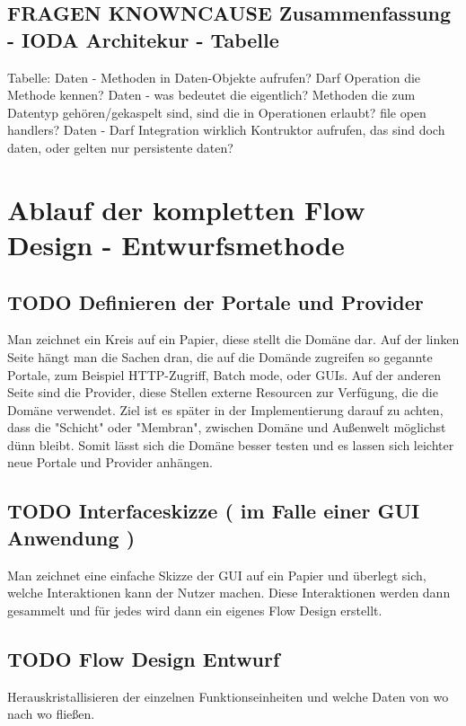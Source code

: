 \documentclass[11pt]{article}
\begin{document}
\subsection{{\bfseries\sffamily FRAGEN} KNOWNCAUSE Zusammenfassung - IODA Architekur -  Tabelle}
\label{sec:orgheadline44}

Tabelle:
Daten - Methoden in Daten-Objekte aufrufen? Darf Operation die Methode kennen?
Daten - was bedeutet die eigentlich? Methoden die zum Datentyp
gehören/gekaspelt sind, sind die in Operationen erlaubt? file open handlers?
Daten - Darf Integration wirklich Kontruktor aufrufen, das sind doch daten, oder gelten nur persistente daten?



\section{Ablauf der kompletten Flow Design - Entwurfsmethode}
\label{sec:orgheadline51}

\subsection{{\bfseries\sffamily TODO} Definieren der Portale und Provider}
\label{sec:orgheadline46}
    Man zeichnet ein Kreis auf ein Papier, diese stellt die Domäne dar.
    Auf der linken Seite hängt man die Sachen dran, die auf die Domände zugreifen so gegannte Portale, zum Beispiel HTTP-Zugriff,
    Batch mode, oder GUIs.
    Auf der anderen Seite sind die Provider, diese Stellen externe Resourcen zur Verfügung, die die Domäne verwendet.
    Ziel ist es später in der Implementierung darauf zu achten, dass die "Schicht" oder "Membran", zwischen Domäne und Außenwelt möglichst
dünn bleibt. Somit lässt sich die Domäne besser testen und es lassen sich leichter neue Portale und Provider anhängen.

\subsection{{\bfseries\sffamily TODO} Interfaceskizze ( im Falle einer GUI Anwendung )}
\label{sec:orgheadline47}
Man zeichnet eine einfache Skizze der GUI auf ein Papier und überlegt sich, welche Interaktionen kann der Nutzer machen.
Diese Interaktionen werden dann gesammelt und für jedes wird dann ein eigenes Flow Design erstellt.

\subsection{{\bfseries\sffamily TODO} Flow Design Entwurf}
\label{sec:orgheadline48}
Herauskristallisieren der einzelnen Funktionseinheiten und welche Daten von wo nach wo fließen.
\end{document}
